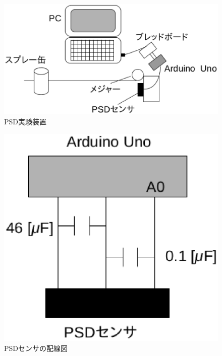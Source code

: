 \documentclass[10pt,a4j]{jarticle}
\begin{document}
\begin{figure}[t]
  \begin{center}
   \includegraphics[scale = 0.8]{picture/psded.eps}
   \caption{PSD実験装置}
   \label{psded}
  \end{center}
\end{figure}

\begin{figure}
 \begin{center}   
  \includegraphics[scale = 0.8]{picture/psdwd.eps}
  \caption{PSDセンサの配線図}
  \label{psdwd}
 \end{center}
\end{figure}


\newpage
\end{document}
